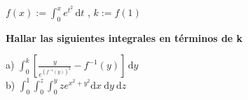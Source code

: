 {\begin{enumerate}
		\begin{center}
			$f(x):=\displaystyle \int_{0}^{ x } e^{t^2} \, \mathrm{d}t $ , \hspace{1 cm} $k:=f(1) $
		\end{center}
		{\bf Hallar las siguientes integrales en términos de k}
		\begin{multicols}{2}
			a) 
			$
			\displaystyle \int_{0}^{ k } \left[ \frac{y}{e^{(f^{-1} (y))^2}} -f^{-1} (y) \right]\, \mathrm{d} y
			$
			\\
			b)
			$
			\displaystyle \int_{0}^{ 1 } \int_{0}^{ z } \int_{0}^{ y }  ze^{x^2+y^2}  \mathrm{d} x \  \mathrm{d} y \  \mathrm{d} z
			$
		\end{multicols} %
		
	\end{enumerate}
	
} 

